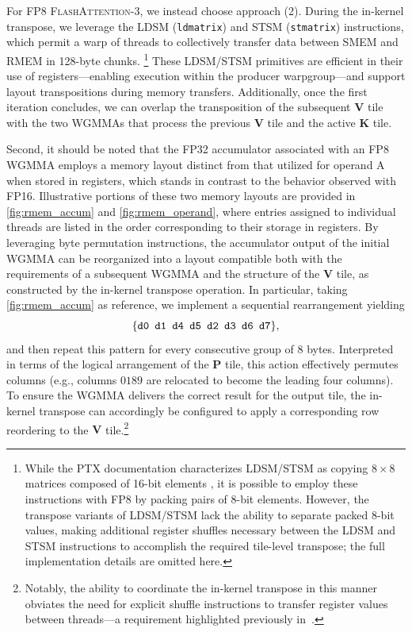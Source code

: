\begin{enumerate}
For FP8 \textsc{FlashAttention-3}, we instead choose approach (2). During the in-kernel transpose, we leverage the LDSM (\verb|ldmatrix|) and STSM (\verb|stmatrix|) instructions, which permit a warp of threads to collectively transfer data between SMEM and RMEM in 128-byte chunks. \footnote{While the PTX documentation characterizes LDSM/STSM as copying $8 \times 8$ matrices composed of 16-bit elements \cite[\S 9.7.13.4.15-16]{ptx}, it is possible to employ these instructions with FP8 by packing pairs of 8-bit elements. However, the transpose variants of LDSM/STSM lack the ability to separate packed 8-bit values, making additional register shuffles necessary between the LDSM and STSM instructions to accomplish the required tile-level transpose; the full implementation details are omitted here.} These LDSM/STSM primitives are efficient in their use of registers—enabling execution within the producer warpgroup—and support layout transpositions during memory transfers. Additionally, once the first iteration concludes, we can overlap the transposition of the subsequent $\mathbf{V}$ tile with the two WGMMAs that process the previous $\mathbf{V}$ tile and the active $\mathbf{K}$ tile.

Second, it should be noted that the FP32 accumulator associated with an FP8 WGMMA employs a memory layout distinct from that utilized for operand A when stored in registers, which stands in contrast to the behavior observed with FP16. Illustrative portions of these two memory layouts are provided in \cref{fig:rmem_accum} and \cref{fig:rmem_operand}, where entries assigned to individual threads are listed in the order corresponding to their storage in registers. By leveraging byte permutation instructions, the accumulator output of the initial WGMMA can be reorganized into a layout compatible both with the requirements of a subsequent WGMMA and the structure of the $\mathbf{V}$ tile, as constructed by the in-kernel transpose operation. In particular, taking \cref{fig:rmem_accum} as reference, we implement a sequential rearrangement yielding
$$\{ \verb|d0 d1 d4 d5 d2 d3 d6 d7| \},$$
and then repeat this pattern for every consecutive group of 8 bytes. Interpreted in terms of the logical arrangement of the $\mathbf{P}$ tile, this action effectively permutes columns (e.g., columns $0189$ are relocated to become the leading four columns). To ensure the WGMMA delivers the correct result for the output tile, the in-kernel transpose can accordingly be configured to apply a corresponding row reordering to the $\mathbf{V}$ tile.\footnote{Notably, the ability to coordinate the in-kernel transpose in this manner obviates the need for explicit shuffle instructions to transfer register values between threads—a requirement highlighted previously in~\citep{colfax_fp8_flashattention_2024}.}


\end{enumerate}
